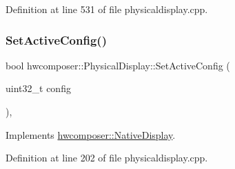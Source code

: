 Definition at line 531 of file physicaldisplay.\+cpp.


\begin{DoxyCode}{0}
\end{DoxyCode}
\mbox{\label{classhwcomposer_1_1PhysicalDisplay_a1b2e31ee497b3fec8178abe481462560}} 
\subsubsection{\texorpdfstring{Set\+Active\+Config()}{SetActiveConfig()}}
{\footnotesize\ttfamily bool hwcomposer\+::\+Physical\+Display\+::\+Set\+Active\+Config (\begin{DoxyParamCaption}\item[{uint32\+\_\+t}]{config }\end{DoxyParamCaption})\hspace{0.3cm}{\ttfamily [override]}, {\ttfamily [virtual]}}



Implements \mbox{\hyperlink{classhwcomposer_1_1NativeDisplay_a63c51853e0d82baf9d6445cf831a5ad1}{hwcomposer\+::\+Native\+Display}}.



Definition at line 202 of file physicaldisplay.\+cpp.


